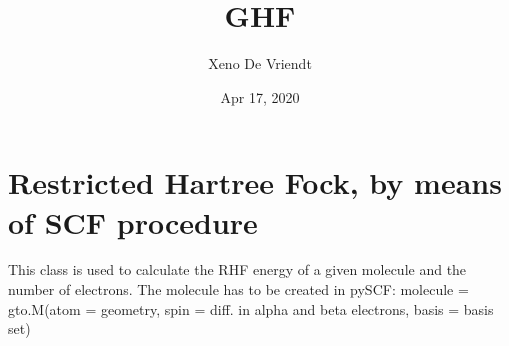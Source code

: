 \documentclass[letterpaper,10pt,english]{sphinxmanual}
\title{GHF}
\date{Apr 17, 2020}
\author{Xeno De Vriendt}
\begin{document}
\pagestyle{empty}
\sphinxmaketitle
\pagestyle{plain}
\sphinxtableofcontents
\pagestyle{normal}
\label{\detokenize{index::doc}}

\label{\detokenize{RHF:module-hf.RHF}}

\chapter{Restricted Hartree Fock, by means of SCF procedure}
\label{\detokenize{RHF:restricted-hartree-fock-by-means-of-scf-procedure}}\label{\detokenize{RHF::doc}}
This class is used to calculate the RHF energy of a given molecule and the number of electrons.
The molecule has to be created in pySCF:
molecule = gto.M(atom = geometry, spin = diff. in alpha and beta electrons, basis = basis set)
\end{document}
